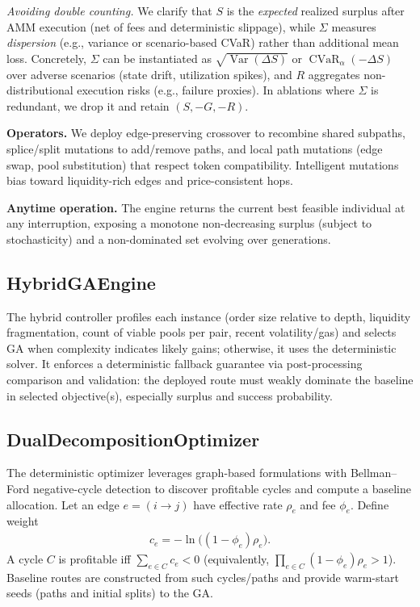 \documentclass[11pt]{article}
\DeclareMathOperator{\Var}{Var}
\DeclareMathOperator{\CVaR}{CVaR}
\newcommand{\1}{\mathbf{1}}  %
\begin{document}
\textit{Avoiding double counting.} We clarify that $S$ is the \emph{expected} realized surplus after AMM execution (net of fees and deterministic slippage), while $\Sigma$ measures \emph{dispersion} (e.g., variance or scenario-based CVaR) rather than additional mean loss. Concretely, $\Sigma$ can be instantiated as $\sqrt{\Var(\Delta S)}$ or $\CVaR_{\alpha}(-\Delta S)$ over adverse scenarios (state drift, utilization spikes), and $R$ aggregates non-distributional execution risks (e.g., failure proxies). In ablations where $\Sigma$ is redundant, we drop it and retain $(S,-G,-R)$.

\textbf{Operators.} We deploy edge-preserving crossover to recombine shared subpaths, splice/split mutations to add/remove paths, and local path mutations (edge swap, pool substitution) that respect token compatibility. Intelligent mutations bias toward liquidity-rich edges and price-consistent hops.

\textbf{Anytime operation.} The engine returns the current best feasible individual at any interruption, exposing a monotone non-decreasing surplus (subject to stochasticity) and a non-dominated set evolving over generations.

\subsection{HybridGAEngine}
The hybrid controller profiles each instance (order size relative to depth, liquidity fragmentation, count of viable pools per pair, recent volatility/gas) and selects GA when complexity indicates likely gains; otherwise, it uses the deterministic solver. It enforces a deterministic fallback guarantee via post-processing comparison and validation: the deployed route must weakly dominate the baseline in selected objective(s), especially surplus and success probability.

\subsection{DualDecompositionOptimizer}
The deterministic optimizer leverages graph-based formulations with Bellman--Ford negative-cycle detection to discover profitable cycles and compute a baseline allocation. Let an edge $e=(i\to j)$ have effective rate $\rho_e$ and fee $\phi_e$. Define weight
\begin{align}
 c_e = -\ln\big((1-\phi_e)\rho_e\big).\label{eq:edge-weight}
\end{align}
A cycle $C$ is profitable iff $\sum_{e\in C} c_e < 0$ (equivalently, $\prod_{e\in C}(1-\phi_e)\rho_e > 1$). Baseline routes are constructed from such cycles/paths and provide warm-start seeds (paths and initial splits) to the GA.
\end{document}
